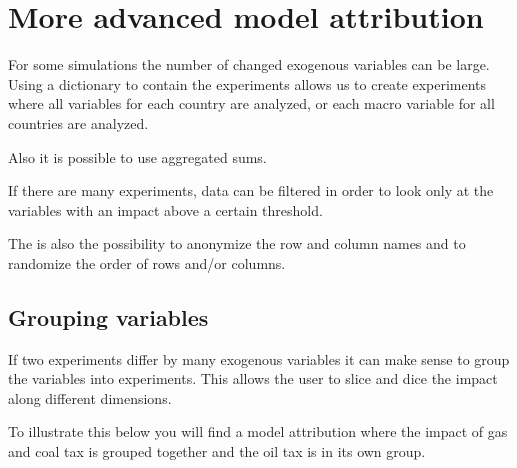 \documentclass[letterpaper,10pt,english]{jupyterBook}
\begin{document}
\section{More advanced model attribution}
\label{\detokenize{content/06_ModelAnalytics/AttributionSomeFeatures:more-advanced-model-attribution}}
\sphinxAtStartPar
For some  simulations the number of changed exogenous variables can be large. Using a dictionary to contain the experiments allows us to create experiments where all variables for each country are analyzed, or each macro variable for all countries are analyzed.

\sphinxAtStartPar
Also it is possible to use aggregated sums.

\sphinxAtStartPar
If there are many experiments, data can be filtered in order to look only at the variables with an impact above a certain threshold.

\sphinxAtStartPar
The is also the possibility to anonymize the row and column names and to randomize the order of rows and/or columns.


\subsection{Grouping variables}
\label{\detokenize{content/06_ModelAnalytics/AttributionSomeFeatures:grouping-variables}}
\sphinxAtStartPar
If two experiments differ by many exogenous variables it can make sense to group the variables into experiments. This allows the user to
slice and dice the impact along different dimensions.

\sphinxAtStartPar
To illustrate this below you will find a model attribution where the impact of gas and coal tax is grouped together and the oil tax is in its own group.
\end{document}
